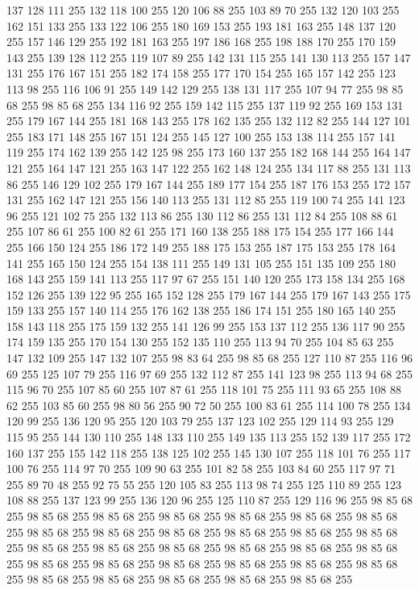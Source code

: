 137 128 111 255 132 118 100 255 120 106 88 255 103 89 70 255 132 120 103 255 162 151 133 255 133 122 106 255 180 169 153 255 193 181 163 255 148 137 120 255 157 146 129 255 192 181 163 255 197 186 168 255 198 188 170 255 170 159 143 255 139 128 112 255 119 107 89 255 142 131 115 255 141 130 113 255 157 147 131 255 176 167 151 255 182 174 158 255 177 170 154 255 165 157 142 255 123 113 98 255 116 106 91 255 149 142 129 255 138 131 117 255 107 94 77 255 98 85 68 255 98 85 68 255 134 116 92 255 159 142 115 255 137 119 92 255 169 153 131 255 179 167 144 255 181 168 143 255 178 162 135 255 132 112 82 255 144 127 101 255 183 171 148 255 167 151 124 255 145 127 100 255 153 138 114 255 157 141 119 255 174 162 139 255 142 125 98 255 173 160 137 255 182 168 144 255 164 147 121 255 164 147 121 255 163 147 122 255 162 148 124 255 134 117 88 255 131 113 86 255 146 129 102 255 179 167 144 255 189 177 154 255 187 176 153 255 172 157 131 255 162 147 121 255 156 140 113 255 131 112 85 255 119 100 74 255
141 123 96 255 121 102 75 255 132 113 86 255 130 112 86 255 131 112 84 255 108 88 61 255 107 86 61 255 100 82 61 255 171 160 138 255 188 175 154 255 177 166 144 255 166 150 124 255 186 172 149 255 188 175 153 255 187 175 153 255 178 164 141 255 165 150 124 255 154 138 111 255 149 131 105 255 151 135 109 255 180 168 143 255 159 141 113 255 117 97 67 255 151 140 120 255 173 158 134 255 168 152 126 255 139 122 95 255 165 152 128 255 179 167 144 255 179 167 143 255 175 159 133 255 157 140 114 255 176 162 138 255 186 174 151 255 180 165 140 255 158 143 118 255 175 159 132 255 141 126 99 255 153 137 112 255 136 117 90 255 174 159 135 255 170 154 130 255 152 135 110 255 113 94 70 255 104 85 63 255 147 132 109 255 147 132 107 255 98 83 64 255 98 85 68 255 127 110 87 255 116 96 69 255 125 107 79 255 116 97 69 255 132 112 87 255 141 123 98 255 113 94 68 255 115 96 70 255 107 85 60 255 107 87 61 255 118 101 75 255 111 93 65 255 108 88 62 255 103 85 60 255 98 80 56 255
90 72 50 255 100 83 61 255 114 100 78 255 134 120 99 255 136 120 95 255 120 103 79 255 137 123 102 255 129 114 93 255 129 115 95 255 144 130 110 255 148 133 110 255 149 135 113 255 152 139 117 255 172 160 137 255 155 142 118 255 138 125 102 255 145 130 107 255 118 101 76 255 117 100 76 255 114 97 70 255 109 90 63 255 101 82 58 255 103 84 60 255 117 97 71 255 89 70 48 255 92 75 55 255 120 105 83 255 113 98 74 255 125 110 89 255 123 108 88 255 137 123 99 255 136 120 96 255 125 110 87 255 129 116 96 255 98 85 68 255 98 85 68 255 98 85 68 255 98 85 68 255 98 85 68 255 98 85 68 255 98 85 68 255 98 85 68 255 98 85 68 255 98 85 68 255 98 85 68 255 98 85 68 255 98 85 68 255 98 85 68 255 98 85 68 255 98 85 68 255 98 85 68 255 98 85 68 255 98 85 68 255 98 85 68 255 98 85 68 255 98 85 68 255 98 85 68 255 98 85 68 255 98 85 68 255 98 85 68 255 98 85 68 255 98 85 68 255 98 85 68 255 98 85 68 255
